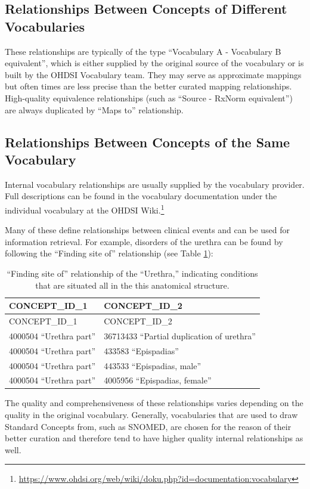 \documentclass[11pt]{book}
\let\rmarkdownfootnote\footnote%
\def\footnote{\protect\rmarkdownfootnote}
\theoremstyle{definition}
\theoremstyle{definition}
\theoremstyle{definition}
\theoremstyle{remark}
\begin{document}
\subsection{Relationships Between Concepts of Different
Vocabularies}\label{relationships-between-concepts-of-different-vocabularies}

These relationships are typically of the type ``Vocabulary A -
Vocabulary B equivalent'', which is either supplied by the original
source of the vocabulary or is built by the OHDSI Vocabulary team. They
may serve as approximate mappings but often times are less precise than
the better curated mapping relationships. High-quality equivalence
relationships (such as ``Source - RxNorm equivalent'') are always
duplicated by ``Maps to'' relationship.

\subsection{Relationships Between Concepts of the Same
Vocabulary}\label{relationships-between-concepts-of-the-same-vocabulary}

Internal vocabulary relationships are usually supplied by the vocabulary
provider. Full descriptions can be found in the vocabulary documentation
under the individual vocabulary at the OHDSI Wiki.\footnote{\url{https://www.ohdsi.org/web/wiki/doku.php?id=documentation:vocabulary}}

Many of these define relationships between clinical events and can be
used for information retrieval. For example, disorders of the urethra
can be found by following the ``Finding site of'' relationship (see
Table \ref{tab:findingSite}):

\begin{longtable}[]{@{}ll@{}}
\caption{\label{tab:findingSite} ``Finding site of'' relationship of the
``Urethra,'' indicating conditions that are situated all in the this
anatomical structure.}\tabularnewline
\toprule
CONCEPT\_ID\_1 & CONCEPT\_ID\_2\tabularnewline
\midrule
\endfirsthead
\toprule
CONCEPT\_ID\_1 & CONCEPT\_ID\_2\tabularnewline
\midrule
\endhead
4000504 ``Urethra part'' & 36713433 ``Partial duplication of
urethra''\tabularnewline
4000504 ``Urethra part'' & 433583 ``Epispadias''\tabularnewline
4000504 ``Urethra part'' & 443533 ``Epispadias, male''\tabularnewline
4000504 ``Urethra part'' & 4005956 ``Epispadias, female''\tabularnewline
\bottomrule
\end{longtable}

The quality and comprehensiveness of these relationships varies
depending on the quality in the original vocabulary. Generally,
vocabularies that are used to draw Standard Concepts from, such as
SNOMED, are chosen for the reason of their better curation and therefore
tend to have higher quality internal relationships as well.
\end{document}
